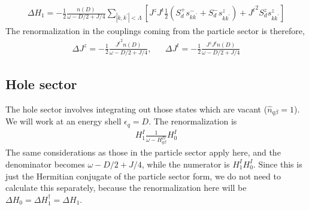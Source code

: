 \begin{equation}\begin{aligned}
	\Delta H_1 = -\frac{1}{2}\frac{n(D)}{\omega - D/2 + J/4}\sum_{|k,k^\prime|<\Lambda}\left[J^z J^t \frac{1}{2}\left(S_d^+ s^-_{kk^\prime} + S_d^- s^z_{kk^\prime}\right) + {J^t}^2 S_d^z s^z_{kk^\prime}\right]
\end{aligned}\end{equation}
The renormalization in the couplings coming from the particle sector is therefore,
\begin{equation}\begin{aligned}
	\label{kondo_part}
	\Delta J^z = -\frac{1}{2}\frac{{J^t}^2n(D)}{\omega - D/2 + J/4}, && \Delta J^t = -\frac{1}{2}\frac{J^z J^tn(D)}{\omega - D/2 + J/4}
\end{aligned}\end{equation}


\subsection{Hole sector}
The hole sector involves integrating out those states which are vacant (\(\hat n_{q\beta}=1\)). We will work at an energy  shell \(\epsilon_q = D\). The renormalization is
\begin{equation}\begin{aligned}
	H^I_1 \frac{1}{\omega - H^D_{q\beta}} H^I_0
\end{aligned}\end{equation}
The same considerations as those in the particle sector apply here, and the denominator becomes \(\omega - D/2 + J/4\), while the numerator is \(H^I_1 H^I_0\). Since this is just the Hermitian conjugate of the particle sector form, we do not need to calculate this separately, because the renormalization here will be \(\Delta H_0 = \Delta H_1^\dagger = \Delta H_1\).


